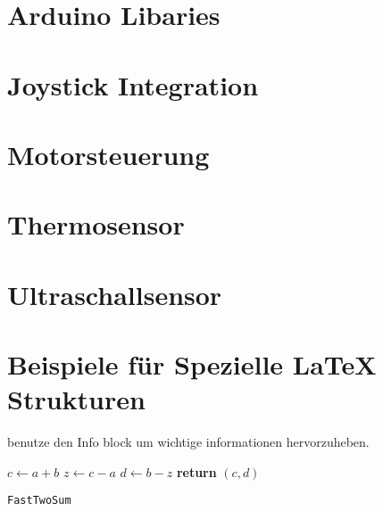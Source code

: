\documentclass{article}
\begin{document}
        
        
        
    
\newpage
\section{Arduino Libaries} %

\newpage
\section{Joystick Integration} %

\newpage
\section{Motorsteuerung} %

\newpage
\section{Thermosensor} %

\newpage
\section{Ultraschallsensor} %


\newpage
\section{Beispiele für Spezielle LaTeX Strukturen}

\begin{info} %
	benutze den Info block um wichtige informationen hervorzuheben.
\end{info}


\begin{center}
	\begin{minipage}{0.5\linewidth} %
		\begin{algorithm}[H]
			\medskip
			$c \leftarrow a + b$ \;
			$z \leftarrow c - a$ \;
			$d \leftarrow b - z$ \;
			{\bf return} $(c,d)$ \;
			\caption{\texttt{FastTwoSum}} %
			\label{alg:fastTwoSum}   %
		\end{algorithm}
	\end{minipage}
\end{center}
\end{document}
